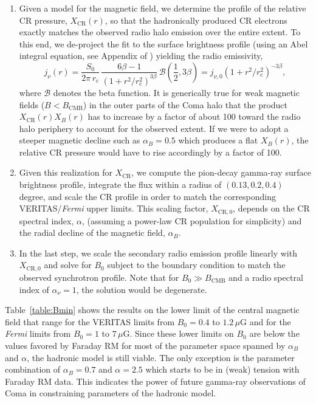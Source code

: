 \documentclass[12pt,manuscript]{aastex}
\newcommand{\rmn}{\mathrm}
\newcommand{\CR}{\mathrm{CR}}
\begin{document}
\begin{enumerate}
\item Given a model for the magnetic field, we determine the profile of the relative CR pressure, $X_{\CR}(r)$, so that the hadronically produced CR electrons exactly matches the observed radio halo emission over the entire extent. To this end, we de-project the fit to the surface brightness profile (using an Abel integral equation, see Appendix of \citealt{article:PfrommerEnsslin:2004b}) yielding the radio emissivity,
\begin{equation}
\label{eq:Coma:radio}
j_{\nu} (r) = \frac{S_{0}}{2\pi\, r_{\rmn{c}}}\,
\frac{6\beta - 1}{\left(1 + r^{2}/r_{\rmn{c}}^{2}\right)^{3 \beta}}\,
\mathcal{B}\left(\frac{1}{2}, 3\beta\right)
= j_{\nu,0} \left(1 + r^2/r_{\rmn{c}}^{2}\right)^{-3 \beta},
\end{equation}
where $\mathcal{B}$ denotes the beta function. It is generically true for weak magnetic fields ($B<B_{\rmn{CMB}}$) in the outer parts of the Coma halo that the product $X_{\CR}(r)X_{B}(r)$ has to increase by a factor of about 100 toward the radio halo periphery to account for the observed extent. If we were to adopt a steeper magnetic decline such as $\alpha_{B}=0.5$ which produces a flat $X_{B}(r)$, the relative CR pressure would have to rise accordingly by a factor of 100.

\item Given this realization for $X_{\CR}$, we compute the pion-decay gamma-ray surface brightness profile, integrate the flux within a radius of $(0.13, 0.2, 0.4)$ degree, and scale the CR profile in order to match the corresponding VERITAS/{\em Fermi} upper limits. This scaling factor, $X_{\CR,0}$, depends on the CR spectral index, $\alpha$, (assuming a power-law CR population for simplicity) and the radial decline of the magnetic field, $\alpha_{B}$.

\item In the last step, we scale the secondary radio emission profile linearly with $X_{\CR,0}$ and solve for $B_{0}$ subject to the boundary condition to match the observed synchrotron profile. Note that for $B_{0} \gg B_{\rmn{CMB}}$ and a radio spectral index of $\alpha_{\nu}=1$, the solution would be degenerate.
\end{enumerate}

Table~\ref{table:Bmin} shows the results on the lower limit of the central magnetic field that range for the VERITAS limits from $B_{0} = 0.4$ to $1.2\,\mu$G and for the {\em Fermi} limits from $B_{0} = 1$ to $7\,\mu$G. Since these lower limits on $B_0$ are below the values favored by Faraday RM for most of the parameter space spanned by $\alpha_B$ and $\alpha$, the hadronic model is still viable. The only exception is the parameter combination of $\alpha_B=0.7$ and $\alpha=2.5$ which starts to be in (weak) tension with Faraday RM data. This indicates the power of future gamma-ray observations of Coma in constraining parameters of the hadronic model.
\end{document}
